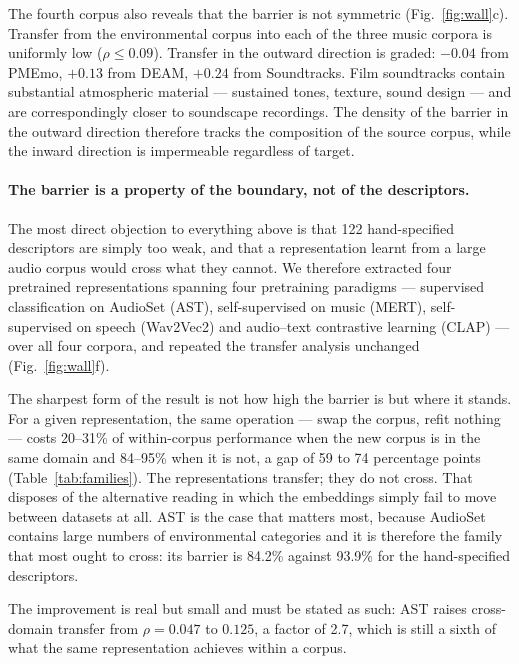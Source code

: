 The fourth corpus also reveals that the barrier is not symmetric
(Fig.~\ref{fig:wall}c). Transfer from the environmental corpus into each of the
three music corpora is uniformly low ($\rho \le 0.09$). Transfer in the outward
direction is graded: $-0.04$ from PMEmo, $+0.13$ from DEAM, $+0.24$ from
Soundtracks. Film soundtracks contain substantial atmospheric material ---
sustained tones, texture, sound design --- and are correspondingly closer to
soundscape recordings. The density of the barrier in the outward direction
therefore tracks the composition of the source corpus, while the inward direction
is impermeable regardless of target.

\paragraph{The barrier is a property of the boundary, not of the descriptors.}
The most direct objection to everything above is that 122 hand-specified
descriptors are simply too weak, and that a representation learnt from a large
audio corpus would cross what they cannot. We therefore extracted four pretrained
representations spanning four pretraining paradigms --- supervised classification
on AudioSet (AST), self-supervised on music (MERT), self-supervised on speech
(Wav2Vec2) and audio--text contrastive learning (CLAP) --- over all four corpora,
and repeated the transfer analysis unchanged (Fig.~\ref{fig:wall}f).

The sharpest form of the result is not how high the barrier is but where it stands.
For a given representation, the same operation --- swap the corpus, refit nothing
--- costs 20--31\% of within-corpus performance when the new corpus is in the same
domain and 84--95\% when it is not, a gap of 59 to 74 percentage points
(Table~\ref{tab:families}). The representations transfer; they do not cross. That
disposes of the alternative reading in which the embeddings simply fail to move
between datasets at all. AST is the case that matters most, because AudioSet
contains large numbers of environmental categories and it is therefore the family
that most ought to cross: its barrier is 84.2\% against 93.9\% for the
hand-specified descriptors.

The improvement is real but small and must be stated as such: AST raises
cross-domain transfer from $\rho = 0.047$ to $0.125$, a factor of 2.7, which is
still a sixth of what the same representation achieves within a corpus.

